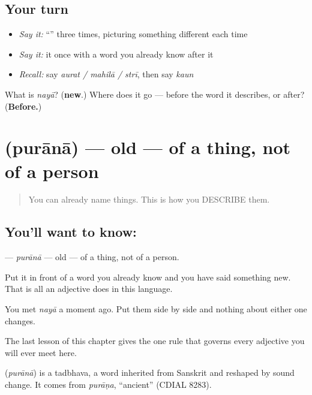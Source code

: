 \subsection*{Your turn}
\begin{itemize}
\raggedright
  \item \emph{Say it:} \textquotedblleft{}\textquotedblright{} three times, picturing something different each time
  \item \emph{Say it:} it once with a word you already know after it
  \item \emph{Recall:} say \emph{aurat / mahilā / strī}, then say \emph{kaun}
\end{itemize}

\begin{tcolorbox}[breakable,colback=teal!4,colframe=teal!35!black,title={Before you move on}]
What is \emph{nayā}? (\textbf{new}.) Where does it go — before the word it describes, or after? (\textbf{Before.})
\end{tcolorbox}
\section[\texorpdfstring{\hi{पुराना} (purānā)}{पुराना (purānā)}]{ (purānā) — old — of a thing, not of a person}

\label{lesson:HI-C41-old}



\begin{quote}
You can already name things. This is how you DESCRIBE them.
\end{quote}

\subsection*{You'll want to know: }
\textbf{} — \emph{purānā} — old — of a thing, not of a person.

Put it in front of a word you already know and you have said something new. That is all an adjective does in this language.

You met \textbf{} \emph{nayā} a moment ago. Put them side by side and nothing about either one changes.

The last lesson of this chapter gives the one rule that governs every adjective you will ever meet here.

\begin{cousinweb}
\textbf{} (\emph{purānā}) is a tadbhava, a word inherited from Sanskrit and reshaped by sound change. It comes from \emph{purāṇa}, \textquotedblleft{}ancient\textquotedblright{} (CDIAL 8283).
\end{cousinweb}

